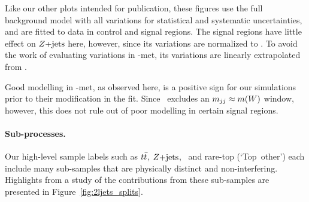 Like our other plots intended for publication, these figures use the full
background model with all variations for statistical and systematic
uncertainties,
and are fitted to data in control and signal regions.
The signal regions have little effect on $Z\mathrm{+jets}$ here, however, since its
variations are normalized to \crz.
To avoid the work of evaluating variations in \crz-met, its variations are
linearly extrapolated from \crz.

Good modelling in \crz-met, as observed here, is a positive sign for our
simulations prior to their modification in the fit.
Since \crz\ excludes an $m_{jj} \approx m(W)$ window, however, this does not
rule out of poor modelling in certain signal regions.


\paragraph{Sub-processes.}
Our high-level sample labels such as $t\bar t$, $Z\mathrm{+jets}$, \diboson\ and
rare-top (`Top~other') each include many sub-samples that are physically
distinct and non-interfering.
Highlights from a study of the contributions from these sub-samples are
presented in Figure~\ref{fig:2ljets_splits}.

